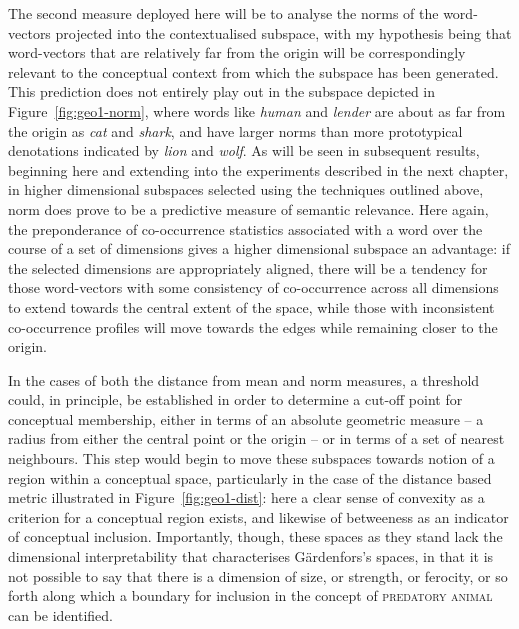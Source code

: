The second measure deployed here will be to analyse the norms of the word-vectors projected into the contextualised subspace, with my hypothesis being that word-vectors that are relatively far from the origin will be correspondingly relevant to the conceptual context from which the subspace has been generated.  This prediction does not entirely play out in the subspace depicted in Figure~\ref{fig:geo1-norm}, where words like \emph{human} and \emph{lender} are about as far from the origin as \emph{cat} and \emph{shark}, and have larger norms than more prototypical denotations indicated by \emph{lion} and \emph{wolf}.  As will be seen in subsequent results, beginning here and extending into the experiments described in the next chapter, in higher dimensional subspaces selected using the techniques outlined above, norm does prove to be a predictive measure of semantic relevance.  Here again, the preponderance of co-occurrence statistics associated with a word over the course of a set of dimensions gives a higher dimensional subspace an advantage: if the selected dimensions are appropriately aligned, there will be a tendency for those word-vectors with some consistency of co-occurrence across all dimensions to extend towards the central extent of the space, while those with inconsistent co-occurrence profiles will move towards the edges while remaining closer to the origin.

In the cases of both the distance from mean and norm measures, a threshold could, in principle, be established in order to determine a cut-off point for conceptual membership, either in terms of an absolute geometric measure -- a radius from either the central point or the origin -- or in terms of a set of nearest neighbours.  This step would begin to move these subspaces towards  notion of a region within a conceptual space, particularly in the case of the distance based metric illustrated in Figure~\ref{fig:geo1-dist}: here a clear sense of convexity as a criterion for a conceptual region exists, and likewise of betweeness as an indicator of conceptual inclusion.  Importantly, though, these spaces as they stand lack the dimensional interpretability that characterises G\"{a}rdenfors's spaces, in that it is not possible to say that there is a dimension of size, or strength, or ferocity, or so forth along which a boundary for inclusion in the concept of \textsc{predatory animal} can be identified.

